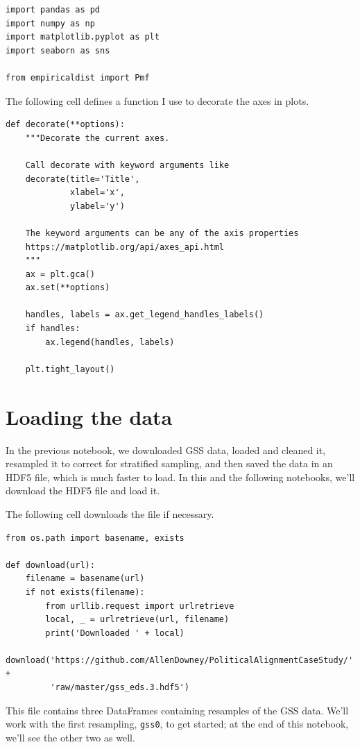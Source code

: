 \begin{lstlisting}[]
import pandas as pd
import numpy as np
import matplotlib.pyplot as plt
import seaborn as sns

from empiricaldist import Pmf
\end{lstlisting}

The following cell defines a function I use to decorate the axes in
plots.

\begin{lstlisting}[]
def decorate(**options):
    """Decorate the current axes.
    
    Call decorate with keyword arguments like
    decorate(title='Title',
             xlabel='x',
             ylabel='y')
             
    The keyword arguments can be any of the axis properties
    https://matplotlib.org/api/axes_api.html
    """
    ax = plt.gca()
    ax.set(**options)
    
    handles, labels = ax.get_legend_handles_labels()
    if handles:
        ax.legend(handles, labels)

    plt.tight_layout()
\end{lstlisting}

\hypertarget{loading-the-data}{%
\section{Loading the data}\label{loading-the-data}}

In the previous notebook, we downloaded GSS data, loaded and cleaned it,
resampled it to correct for stratified sampling, and then saved the data
in an HDF5 file, which is much faster to load. In this and the following
notebooks, we'll download the HDF5 file and load it.

The following cell downloads the file if necessary.

\begin{lstlisting}[]
from os.path import basename, exists

def download(url):
    filename = basename(url)
    if not exists(filename):
        from urllib.request import urlretrieve
        local, _ = urlretrieve(url, filename)
        print('Downloaded ' + local)

download('https://github.com/AllenDowney/PoliticalAlignmentCaseStudy/' +
         'raw/master/gss_eds.3.hdf5')
\end{lstlisting}

This file contains three DataFrames containing resamples of the GSS
data. We'll work with the first resampling,
\passthrough{\lstinline!gss0!}, to get started; at the end of this
notebook, we'll see the other two as well.

